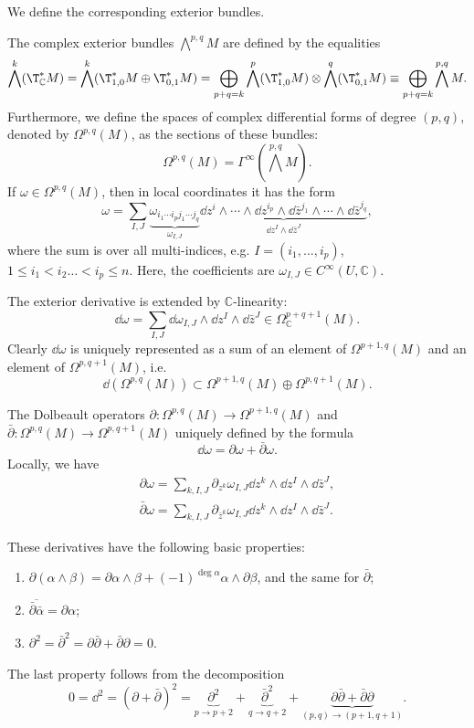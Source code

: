 We define the corresponding exterior bundles.

\begin{defn}
    The complex exterior bundles $\bigwedge^{p,q}M$ are defined by the equalities \[\bigwedge^k(\T^\ast_\mathbb{C}M)=\bigwedge^k(\T^\ast_{1,0}M\oplus \T^\ast_{0,1}M)=\bigoplus_{p+q=k}\bigwedge^p(\T^\ast_{1,0}M)\otimes \bigwedge^q(\T^\ast_{0,1}M)\equiv \bigoplus_{p+q=k}\bigwedge^{p,q}M.\]
    Furthermore, we define the spaces of complex differential forms of degree $(p,q)$, denoted by $\Omega^{p,q}(M)$, as the sections of these bundles:
    \[\Omega^{p,q}(M)=\Gamma^\infty(\bigwedge^{p,q}M).\]
    If $\omega\in\Omega^{p,q}(M)$, then in local coordinates it has the form
    \[\omega=\sum_{I,J}\underbrace{\omega_{i_1\cdots i_pj_1\cdots j_q}}_{\omega_{I,J}}\underbrace{\dd z^i\wedge\cdots\wedge \dd z^{i_p}\wedge\dd \bar z^{j_1}\wedge\cdots\wedge \dd\bar z^{j_q}}_{\dd z^I\wedge \dd\bar z^J},\]
    where the sum is over all multi-indices, e.g. $I=(i_1,\ldots,i_p)$, $1\leq i_1<i_2\ldots<i_p\leq n$. Here, the coefficients are $\omega_{I,J}\in C^\infty (U,\mathbb{C})$.
\end{defn}

 The exterior derivative is extended by $\mathbb{C}$-linearity:
    \[\dd \omega=\sum_{I,J}\dd\omega_{I,J}\wedge\dd z^I\wedge\dd \bar z^J\in\Omega^{p+q+1}_\mathbb{C}(M).\]
Clearly $\dd\omega$ is uniquely represented as a sum of an element of $\Omega^{p+1,q}(M)$ and an element of $\Omega^{p,q+1}(M)$, i.e.
\[\dd(\Omega^{p,q}(M))\subset \Omega^{p+1,q}(M)\oplus\Omega^{p,q+1}(M).\]

\begin{defn}
    The Dolbeault operators $\partial:\Omega^{p,q}(M)\to\Omega^{p+1,q}(M)$ and $\bar\partial:\Omega^{p,q}(M)\to\Omega^{p,q+1}(M)$ uniquely defined by the formula
    \[\dd\omega=\partial\omega+\bar\partial\omega.\]
    Locally, we have 
    \begin{align}
        \partial\omega=\sum_{k,I,J}\partial_{z^k}\omega_{I,J}\dd z^k\wedge\dd z^I\wedge \dd\bar z^J,\\
        \bar\partial\omega=\sum_{k,I,J}\partial_{\bar z^k}\omega_{I,J}\dd z^k\wedge\dd z^I\wedge \dd\bar z^J.
    \end{align}
\end{defn}

These derivatives have the following basic properties:
\begin{enumerate}
    \item $\partial(\alpha\wedge\beta)=\partial\alpha\wedge\beta+(-1)^{\deg\alpha}\alpha\wedge\partial\beta$, and the same for $\bar\partial$;
    \item $\overline{\bar\partial\bar\alpha}=\partial\alpha$;
    \item $\partial^2=\bar\partial^2=\partial\bar\partial+\bar\partial\partial=0.$
\end{enumerate}
The last property follows from the decomposition \[0=\dd^2=(\partial+\bar\partial)^2=\underbrace{\partial^2}_{p\to p+2}+\underbrace{\bar\partial^2}_{q\to q+2}+\underbrace{\partial\bar\partial+\bar\partial\partial}_{(p,q)\to(p+1,q+1)}.\]


